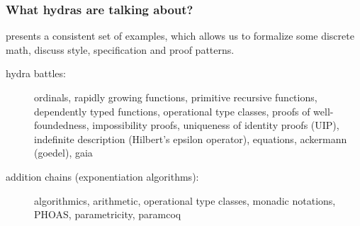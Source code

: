 \documentclass[10pt, fleqn]{beamer}
\begin{document}
\begin{frame}
  \frametitle{What hydras are talking about?}
  \begin{block}{}
   
 \Hydras presents a consistent set of examples, which allows us to formalize
    some \textcolor{mathcolor}{discrete math}, discuss
    \textcolor{coqstylecolor}{\coq style, specification and proof patterns}.

  
  \end{block}
  \begin{block}{}
    \begin{description}
    \item[hydra battles:]
      
      \textcolor{mathcolor}{ordinals},
      \textcolor{mathcolor}{rapidly growing functions},
      \textcolor{mathcolor}{primitive recursive functions}, 
      \textcolor{coqstylecolor}{dependently typed functions},
      \textcolor{coqstylecolor}{operational type classes},
      \textcolor{coqstylecolor}{proofs of well-foundedness},
      \textcolor{coqstylecolor}{impossibility proofs},
      \textcolor{coqstylecolor}{uniqueness of identity proofs (UIP)},
      \textcolor{coqstylecolor}{indefinite description (Hilbert's epsilon operator)}, 
      \textcolor{plugincolor}{equations},
      \textcolor{plugincolor}{ackermann (goedel)},
      \textcolor{plugincolor}{gaia}
      
    \item[addition chains (exponentiation algorithms):]
      \textcolor{mathcolor}{algorithmics},
      \textcolor{mathcolor}{arithmetic},
      \textcolor{coqstylecolor}{operational type classes},
      \textcolor{coqstylecolor}{monadic notations},
      \textcolor{coqstylecolor}{PHOAS},
      \textcolor{coqstylecolor}{parametricity}, 
      \textcolor{plugincolor}{paramcoq}
    \end{description}
  \end{block}
\end{frame}
\end{document}
